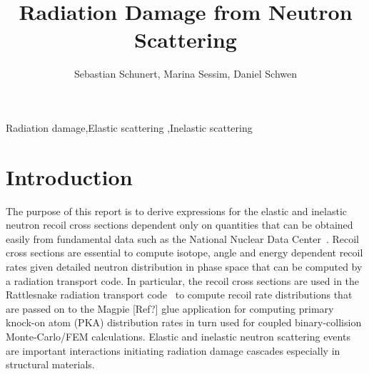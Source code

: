 \documentclass[review]{elsarticle}
\begin{document}
\begin{frontmatter}

\title{Radiation Damage from Neutron Scattering }

\author{Sebastian Schunert, Marina Sessim, Daniel Schwen}
\address{Fuels Modeling and Simulation Department, Idaho National Laboratory, P.O Box 1625, Idaho Falls, ID 83415}




\begin{abstract}

\end{abstract}

\begin{keyword}
Radiation damage\sep Elastic scattering \sep Inelastic scattering
\end{keyword}

\end{frontmatter}

\linenumbers

\section{Introduction}

The purpose of this report is to derive expressions for the elastic and inelastic neutron recoil cross sections dependent only on quantities that can be obtained easily from fundamental data such as the National Nuclear Data Center~\cite{NNDC}. Recoil cross sections are essential to compute isotope, angle and energy dependent recoil rates given detailed neutron distribution in phase space that can be computed by a radiation transport code. In particular, the recoil cross sections are used in the Rattlesnake radiation transport code~\cite{RattlesnakeTheoryManual} to compute recoil rate distributions that are passed on to the Magpie [Ref?] glue application for computing primary knock-on atom (PKA) distribution rates in turn used for coupled binary-collision Monte-Carlo/FEM calculations. Elastic and inelastic neutron scattering events are important interactions initiating radiation damage cascades especially in structural materials.
\end{document}
